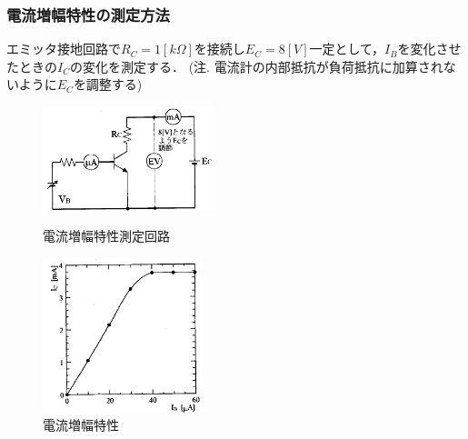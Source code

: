 \documentclass[10pt, a4j, dvipdfmx]{jarticle}
\begin{document}
    \subsubsection{電流増幅特性の測定方法}
    エミッタ接地回路で$R_C = 1[k\Omega]$を接続し$E_C = 8[V]$一定として，$I_B$を変化させたときの$I_C$の変化を測定する．
    \small (注. 電流計の内部抵抗が負荷抵抗に加算されないように$E_C$を調整する)
    \normalsize
    \begin{figure}[H]
        \begin{minipage}{0.5\hsize}
            \centering
            \includegraphics[width=50mm]{fig-5.png}
            \caption{電流増幅特性測定回路}
            \label{fig:5}
        \end{minipage}
        \begin{minipage}{0.5\hsize}
            \centering
            \includegraphics[height=45mm]{fig-6.png}
            \caption{電流増幅特性}
            \label{fig:6}
        \end{minipage}
    \end{figure}
\end{document}
